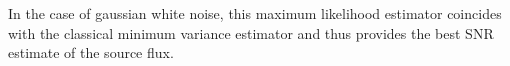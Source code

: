 In the case of gaussian white noise, this maximum likelihood estimator coincides
with the classical minimum variance estimator and thus provides the best SNR
estimate of the source flux.


